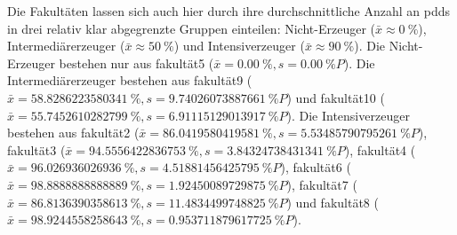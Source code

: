 Die Fakultäten lassen sich auch hier durch ihre durchschnittliche Anzahl an \glspl{pdd} in drei relativ klar abgegrenzte Gruppen einteilen: Nicht-Erzeuger ($\bar{x}\approx\SI[round-mode=places,round-precision=2]{0}{\percent}$), Intermediärerzeuger ($\bar{x}\approx\SI[round-mode=places,round-precision=2]{50}{\percent}$) und Intensiverzeuger ($\bar{x}\approx\SI[round-mode=places,round-precision=2]{90}{\percent}$).
Die Nicht-Erzeuger bestehen nur aus \gls{fakultät5} ($\bar{x}=\SI[round-mode=places,round-precision=2]{0.00}{\percent},s=\SI[round-mode=places,round-precision=2]{0.00}{\percent P}$).
Die Intermediärerzeuger bestehen aus \gls{fakultät9} ($\bar{x}=\SI[round-mode=places,round-precision=2]{58.8286223580341}{\percent},s=\SI[round-mode=places,round-precision=2]{9.74026073887661}{\percent P}$) und \gls{fakultät10} ($\bar{x}=\SI[round-mode=places,round-precision=2]{55.7452610282799}{\percent},s=\SI[round-mode=places,round-precision=2]{6.91115129013917}{\percent P}$).
Die Intensiverzeuger bestehen aus \gls{fakultät2} ($\bar{x}=\SI[round-mode=places,round-precision=2]{86.0419580419581}{\percent},s=\SI[round-mode=places,round-precision=2]{5.53485790795261}{\percent P}$), \gls{fakultät3} ($\bar{x}=\SI[round-mode=places,round-precision=2]{94.5556422836753}{\percent},s=\SI[round-mode=places,round-precision=2]{3.84324738431341}{\percent P}$), \gls{fakultät4} ($\bar{x}=\SI[round-mode=places,round-precision=2]{96.026936026936}{\percent},s=\SI[round-mode=places,round-precision=2]{4.51881456425795}{\percent P}$), \gls{fakultät6} ($\bar{x}=\SI[round-mode=places,round-precision=2]{98.8888888888889}{\percent},s=\SI[round-mode=places,round-precision=2]{1.92450089729875}{\percent P}$), \gls{fakultät7} ($\bar{x}=\SI[round-mode=places,round-precision=2]{86.8136390358613}{\percent},s=\SI[round-mode=places,round-precision=2]{11.4834499748825}{\percent P}$) und \gls{fakultät8} ($\bar{x}=\SI[round-mode=places,round-precision=2]{98.9244558258643}{\percent},s=\SI[round-mode=places,round-precision=2]{0.953711879617725}{\percent P}$).

